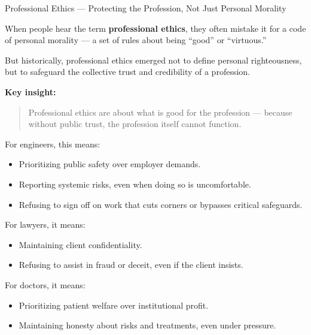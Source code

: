 \medskip

\begin{HistoricalSidebar}{Professional Ethics --- Protecting the Profession, Not Just Personal Morality}

    When people hear the term \textbf{professional ethics}, they often mistake it for a code of personal morality — a set of rules about being “good” or “virtuous.”

    \medskip
    
    But historically, professional ethics emerged not to define personal righteousness, but to safeguard the collective trust and credibility of a profession.
    
    \medskip
    
    \textbf{Key insight:}

    \begin{quote}
        Professional ethics are about what is good for the profession —  
        because without public trust, the profession itself cannot function.
    \end{quote}
    
    For engineers, this means:

    \medskip

    \begin{itemize}
        \item Prioritizing public safety over employer demands.
        \item Reporting systemic risks, even when doing so is uncomfortable.
        \item Refusing to sign off on work that cuts corners or bypasses critical safeguards.
    \end{itemize}

    \medskip
    
    For lawyers, it means:

    \medskip

    \begin{itemize}
        \item Maintaining client confidentiality.
        \item Refusing to assist in fraud or deceit, even if the client insists.
    \end{itemize}

    \medskip
    
    For doctors, it means:

    \medskip

    \begin{itemize}
        \item Prioritizing patient welfare over institutional profit.
        \item Maintaining honesty about risks and treatments, even under pressure.
    \end{itemize}
    

\end{HistoricalSidebar}
